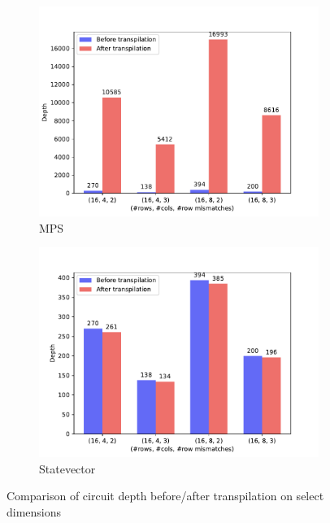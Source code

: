 \documentclass[11pt]{article}
\theoremstyle{definition}
\theoremstyle{remark}
\begin{document}
\begin{figure}[h!]
  \begin{subfigure}{0.48\textwidth}
    \includegraphics[width=\textwidth]{../../results/figures/circuit_depth_before_after_transpilation-MPS.pdf}
    \caption{MPS}
  \end{subfigure}
  \begin{subfigure}{0.48\textwidth}
    \includegraphics[width=\textwidth]{../../results/figures/circuit_depth_before_after_transpilation-statevector_cpu.pdf}
    \caption{Statevector}
  \end{subfigure}
  \caption{Comparison of circuit depth before/after transpilation on select
  dimensions}
  \label{fig:circuit_depth_before_after}
\end{figure}
\end{document}
